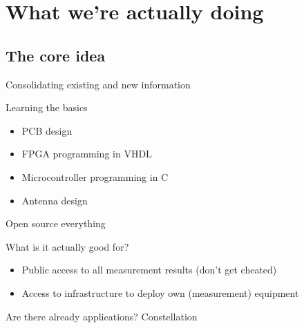 \section{What we're actually doing}

\subsection{The core idea}
	\begin{frame}{Consolidating existing and new information}
	\end{frame}
	\begin{frame}{Learning the basics}
		\begin{itemize}
			\item PCB design
			\item FPGA programming in VHDL
			\item Microcontroller programming in C
			\item Antenna design
		\end{itemize}
	\end{frame}
	\begin{frame}{Open source everything}
	\end{frame}
	\begin{frame}{What is it actually good for?}
		\begin{itemize}
			\item Public access to all measurement results (don't get cheated)
			\item Access to infrastructure to deploy own (measurement) equipment
		\end{itemize}
	\end{frame}
	\begin{frame}{Are there already applications?}
		Constellation
	\end{frame}

